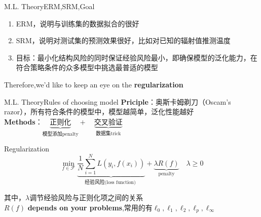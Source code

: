 \documentclass{beamer}
\begin{document}
\begin{frame}{M.L. Theory}{\quad \quad\quad ERM,SRM,Goal}
\begin{enumerate}
  \item ERM，说明与训练集的数据拟合的很好
  \item SRM，说明对测试集的预测效果很好，比如对已知的辐射值推测温度
  \item 目标：最小化结构风险的同时保证经验风险最小，即确保模型的泛化能力，在符合策略条件的众多模型中挑选最普适的模型
  \end{enumerate}  
  \quad \quad Therefore,we\rq{}d like to keep an eye on the \textbf{regularization}


\end{frame}
\begin{frame}[t]{M.L. Theory}{\quad \quad\quad Rules of choosing model}
\textbf{Priciple}：奥斯卡姆剃刀（Oscam's razor），所有符合条件的模型中，模型越简单，泛化性能越好\\
\textbf{Methods}：$
 \underbrace{\textbf{正则化}}_{\text{模型添加penalty}} +\quad  \underbrace{\textbf{交叉验证}}_{\text{数据集trick}}$


\begin{block}{Regularization}
\begin{equation}
\min\limits_{f \in \mathcal{F}}\underbrace{\frac{1}{N}\sum_{i=1}^N L(y_i,f(x_i))}_{\text{经验风险(loss function) }}+ \underbrace{ \lambda R(f)}_{\text{penalty}}\quad \lambda \geq 0
\end{equation}

其中，$\lambda$调节经验风险与正则化项之间的关系\\
$R(f)$ \textbf{depends on your problems},常用的有$\ell_0,\ell_1,\ell_2,\ell_p,\ell_\infty $

\end{block}
\end{frame}
\end{document}
